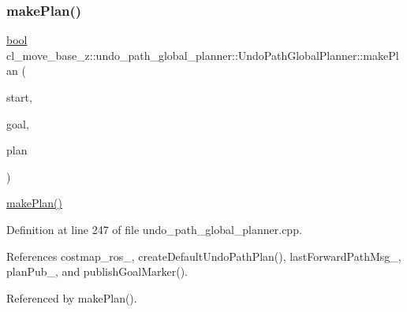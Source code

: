 \subsubsection{\texorpdfstring{make\+Plan()}{makePlan()}\hspace{0.1cm}{\footnotesize\ttfamily [1/2]}}
{\footnotesize\ttfamily \hyperlink{classbool}{bool} cl\+\_\+move\+\_\+base\+\_\+z\+::undo\+\_\+path\+\_\+global\+\_\+planner\+::\+Undo\+Path\+Global\+Planner\+::make\+Plan (\begin{DoxyParamCaption}\item[{const geometry\+\_\+msgs\+::\+Pose\+Stamped \&}]{start,  }\item[{const geometry\+\_\+msgs\+::\+Pose\+Stamped \&}]{goal,  }\item[{std\+::vector$<$ geometry\+\_\+msgs\+::\+Pose\+Stamped $>$ \&}]{plan }\end{DoxyParamCaption})}

\hyperlink{classcl__move__base__z_1_1undo__path__global__planner_1_1UndoPathGlobalPlanner_a46034d27c0811abae440009457a7f8b0}{make\+Plan()} 

Definition at line 247 of file undo\+\_\+path\+\_\+global\+\_\+planner.\+cpp.



References costmap\+\_\+ros\+\_\+, create\+Default\+Undo\+Path\+Plan(), last\+Forward\+Path\+Msg\+\_\+, plan\+Pub\+\_\+, and publish\+Goal\+Marker().



Referenced by make\+Plan().


